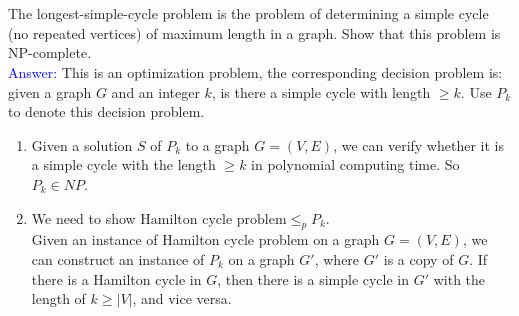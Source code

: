 \documentclass[a4paper]{article}
\begin{document}
\section{} The longest-simple-cycle problem is the problem of determining a simple cycle (no repeated vertices) of maximum length in a graph. Show that this problem is NP-complete.\\
\textcolor{blue}{Answer:} This is an optimization problem, the corresponding decision problem is: given a graph $G$ and an integer $k$, is there a simple cycle with length $\geq k$. Use $P_k$ to denote this decision problem.
\begin{enumerate}
    \item Given a solution $S$ of $P_k$ to a graph $G=(V,E)$, we can verify whether it is a simple cycle with the length $\geq k$ in polynomial computing time. So $P_k\in \textit{NP}$.
    \item We need to show $\text{Hamilton cycle problem}\leq_p P_k$.\\
    Given an instance of Hamilton cycle problem on a graph $G=(V,E)$, we can construct an instance of $P_k$ on a graph $G'$, where $G'$ is a copy of $G$. If there is a Hamilton cycle in $G$, then there is a simple cycle in $G'$ with the length of $k\geq|V|$, and vice versa.
\end{enumerate}
\end{document}
